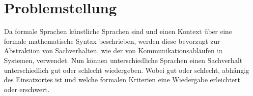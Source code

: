 \section{Problemstellung}
\label{sc:Problemstellung}
Da formale Sprachen künstliche Sprachen sind und einen Kontext über eine formale mathematische Syntax beschrieben, werden diese bevorzugt zur Abstraktion von Sachverhalten, wie der von Kommunikationsabläufen in Systemen, verwendet. Nun können unterschiedliche Sprachen einen Sachverhalt unterschiedlich gut oder schlecht wiedergeben. Wobei gut oder schlecht, abhängig des Einsatzortes ist und welche formalen Kriterien eine Wiedergabe erleichtert oder erschwert.
